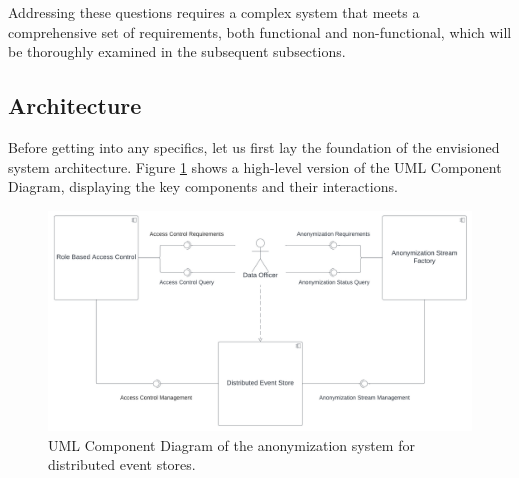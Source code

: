 Addressing these questions requires a complex system that meets a comprehensive set of requirements, both functional and non-functional, which will be thoroughly examined in the subsequent subsections. 

\subsection{Architecture\label{sec:model_architecture}}
Before getting into any specifics, let us first lay the foundation of the envisioned system architecture. Figure \ref{fig:componentDiagram} shows a high-level version of the UML Component Diagram, displaying the key components and their interactions. 

\bigskip 

\begin{figure}[ht]
    \begin{adjustbox}{center}
    \includegraphics[width=0.8\pdfpagewidth]{img/Component_Diagram.pdf}
    \end{adjustbox}
    \caption{UML Component Diagram of the anonymization system for distributed event stores. \label{fig:componentDiagram}}
\end{figure}

